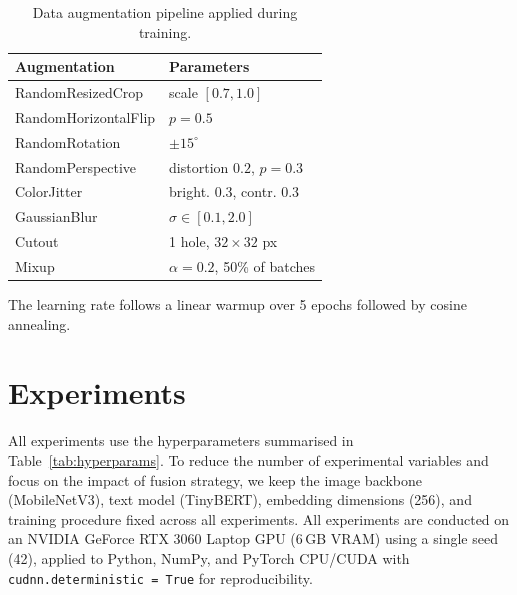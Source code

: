 \documentclass{article}
\begin{document}
\begin{table}[t]
\centering
\caption{Data augmentation pipeline applied during training.}
\label{tab:augmentation}
\small
\begin{tabular}{@{}ll@{}}
\toprule
\textbf{Augmentation} & \textbf{Parameters} \\
\midrule
RandomResizedCrop & scale $[0.7, 1.0]$ \\
RandomHorizontalFlip & $p = 0.5$ \\
RandomRotation & $\pm 15^{\circ}$ \\
RandomPerspective & distortion $0.2$, $p = 0.3$ \\
ColorJitter & bright. $0.3$, contr. $0.3$ \\
GaussianBlur & $\sigma \in [0.1, 2.0]$ \\
Cutout & 1 hole, $32 \!\times\! 32$ px \\
Mixup & $\alpha = 0.2$, 50\% of batches \\
\bottomrule
\end{tabular}
\end{table}

The learning rate follows a linear warmup over 5 epochs followed by cosine annealing.


\section{Experiments}
\label{sec:experiments}

All experiments use the hyperparameters summarised in Table~\ref{tab:hyperparams}. To reduce the number of experimental variables and focus on the impact of fusion strategy, we keep the image backbone (MobileNetV3), text model (TinyBERT), embedding dimensions (256), and training procedure fixed across all experiments. All experiments are conducted on an NVIDIA GeForce RTX 3060 Laptop GPU (6\,GB VRAM) using a single seed (42), applied to Python, NumPy, and PyTorch CPU/CUDA with \texttt{cudnn.deterministic = True} for reproducibility.
\end{document}

